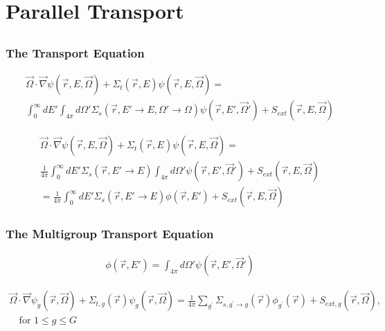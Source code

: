 \documentclass[]{beamer}
\newcommand{\vr}{\vec{r}}
\newcommand{\vo}{\vec{\Omega}}
\begin{document}

\section{Parallel Transport}
\subsection{}
\begin{frame}[t]\frametitle{The Transport Equation}
	\begin{block}{}
	\begin{multline*}
\vo \cdot \vec \nabla \psi(\vr,E,\vo) +\Sigma_t(\vr,E) \psi(\vr,E,\vo)  = \\ \int_{0}^{\infty}dE' \int_{4\pi}d\Omega' \Sigma_s(\vr,E'\to E, \Omega'\to\Omega)\psi(\vr,E',\vo') + S_{ext}(\vr,E,\vo)
	\label{continuous transport}
	\end{multline*}
	\end{block}
	\begin{block}{}
	\begin{multline*}
	\vo \cdot \vec \nabla \psi(\vr,E,\vo) +\Sigma_t(\vr,E) \psi(\vr,E,\vo)  
	= \\\frac{1}{4\pi}\int_{0}^{\infty}dE' \Sigma_s(\vr,E'\to E) \int_{4\pi}d\Omega' \psi(\vr,E',\vo')  + S_{ext}(\vr,E,\vo) \nonumber \\
	 = \frac{1}{4\pi}\int_{0}^{\infty}dE' \Sigma_s(\vr,E'\to E) \phi(\vr,E')  + S_{ext}(\vr,E,\vo)
	\end{multline*}
	\end{block}
\end{frame}

\begin{frame}[t]\frametitle{The Multigroup Transport Equation}
	\begin{block}{}
	\begin{align*}
		\phi(\vr,E') = \int_{4\pi}d\Omega' \psi(\vr,E',\vo')
	\end{align*}
	\end{block}
	\begin{block}{}
	\begin{align*}
	\vo \cdot \vec \nabla \psi_g(\vr,\vo) +\Sigma_{t,g}(\vr) \psi_g(\vr,\vo) = \frac{1}{4\pi}\sum_{g^{\prime}}\Sigma_{s,g^{\prime}\to g}(\vr)\phi_{g^{\prime}}(\vr) + S_{ext,g}(\vr,\vo), \\\quad \text{for } 1 \le g \le G
	\end{align*}
	\end{block}
\end{frame}
\end{document}
